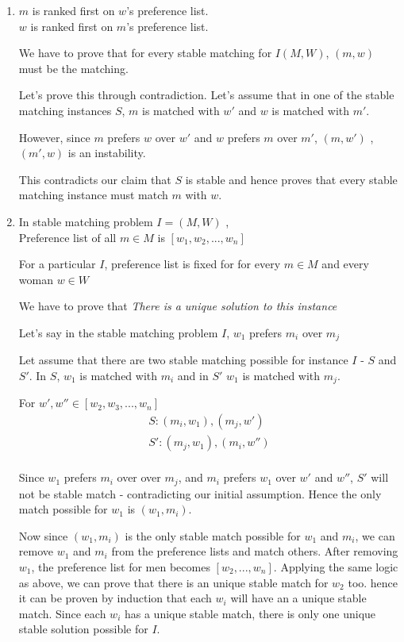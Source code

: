 \documentclass{homeworg}
\begin{document}
\exercise
\begin{enumerate}[label=\alph*)]
\item 
$m$ is ranked first on $w$'s preference list.\\
$w$ is ranked first on $m$'s preference list.

We have to prove that for every stable matching for $I(M,W)$, $(m,w)$ must be the matching.

Let's prove this through contradiction. Let's assume that in one of the stable matching instances $S$, $m$ is matched with $w'$  and $w$ is matched with $m'$.

However, since $m$ prefers $w$ over $w'$ and $w$ prefers $m$ over $m'$, $(m,w')$ , $(m',w)$ is an instability.

This contradicts our claim that $S$ is stable and hence proves that every stable matching instance must match $m$ with $w$.

\item In stable matching problem $I =(M,W)$ ,\\
Preference list of all $m \in M$ is $[w_1,w_2,. .., w_n]$


For a particular $I$, preference list is fixed for for every $m \in M$ and every woman $w \in W$ 

We have to prove that \emph{There is a unique solution to this instance}

Let's say in the stable matching problem $I$, $w_1$ prefers $m_i$ over $m_j$

Let assume that there are two stable matching possible for instance $I$ - $S$ and $S'$.  In $S$, $w_1$ is matched with $m_i$ and in $S'$ $w_1$ is matched with $m_j$.

For $w', w'' \in [w_2,w_3,. .., w_n]$
\begin{align*}
    S : (m_i,w_1),(m_j,w')\\
    S' : (m_j,w_1),(m_i,w'')\\
\end{align*}

Since $w_1$ prefers $m_i$ over over $m_j$, and $m_i$  prefers $w_1$ over $w'$ and $w''$, $S'$ will not be stable match - contradicting our initial assumption. Hence the only match possible for $w_1$ is $(w_1,m_i)$.

Now since $(w_1,m_i)$ is the only stable match possible for $w_1$ and $m_i$, we can remove $w_1$ and $m_i$ from the preference lists and match others. After removing  $w_1$, the preference list for men becomes $[w_2,. .., w_n]$. Applying the same logic as above, we can prove that there is an unique stable match for $w_2$ too. hence it can be proven by induction that each $w_i$ will have an a unique stable match. Since each $w_i$ has a unique stable match, there is only one unique stable solution possible for $I$.

\end{enumerate}
\end{document}
